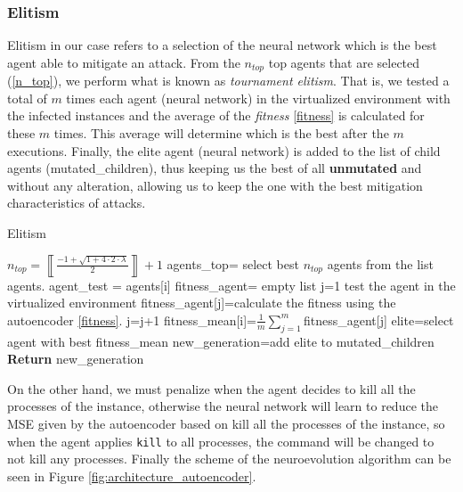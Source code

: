 \documentclass{iosart2c}
\begin{document}
\subsubsection{Elitism}

Elitism in our case refers to a selection of the neural network which is the best agent able to mitigate an attack. From the $n_{top}$ top agents that are selected (\ref{n_top}), we perform what is known as \textit{tournament elitism}. That is, we tested a total of $m$ times each agent (neural network) in the virtualized environment with the infected instances and the average of the \textit{fitness} \ref{fitness} is calculated for these $m$ times. This average will determine which is the best after the $m$ executions. Finally, the elite agent (neural network) is added to the list of child agents (mutated\_children), thus keeping us the best of all \textbf{unmutated} and without any alteration, allowing us to keep the one with the best mitigation characteristics of attacks. \\



\begin{algorithm}[h!]
\caption{Elitism}\label{elitismo}
\begin{algorithmic}[1]
\State $n_{top}=\left\llbracket\frac{-1+\sqrt{1+4\cdot2\cdot \lambda}}{2}\right\rrbracket+1$
\State agents\_top= select best $n_{top}$ agents from the list agents.
    \State agent\_test = agents[i]
    \State fitness\_agent= empty list
    \State j=1
    \Repeat
        \State test the agent in the virtualized environment
        \State fitness\_agent[j]=calculate the fitness using \State the autoencoder \ref{fitness}.
        \State j=j+1
\EndFor
\State fitness\_mean[i]=$\frac{1}{m}\sum^m_{j=1}$fitness\_agent[j]
\State elite=select agent with best fitness\_mean
\State new\_generation=add elite to mutated\_children
\State \textbf{Return} new\_generation
\EndFunction
\end{algorithmic}
\end{algorithm}

On the other hand, we must penalize when the agent decides to kill all the processes of the instance, otherwise the neural network will learn to reduce the MSE given by the autoencoder based on kill all the processes of the instance, so when the agent applies \texttt{kill} to all processes, the command will be changed to not kill any processes. Finally the scheme of the neuroevolution algorithm can be seen in Figure \ref{fig:architecture_autoencoder}.
\end{document}
